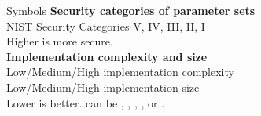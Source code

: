 \begin{minipage}[t]{0.4\textwidth}
\begin{algorithmbox}{Symbols}
        {\bfseries Security categories of parameter sets}\\[0.5\baselineskip]
         NIST Security Categories V, IV, III, II, I\\[\baselineskip]

        Higher is more secure.\\[\baselineskip]

        {\bfseries Implementation complexity and size}\\[0.5\baselineskip]
         Low/Medium/High implementation complexity\\
         Low/Medium/High implementation size\\[\baselineskip]
        Lower is better. {\scriptsize \faAsterisk} can be {\scriptsize \faKey}, {\scriptsize \faPen}, {\scriptsize \faQuestion}, {\scriptsize \faLock}, or {\scriptsize \faUnlock}.\\[\baselineskip]


\end{algorithmbox}
\end{minipage}
